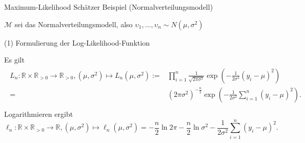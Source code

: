 \documentclass[
  8pt,
  ignorenonframetext,
]{beamer}
\newcommand{\ups} {\upsilon}
\begin{document}
\begin{frame}{Maximum-Likelihood Schätzer}
\protect\hypertarget{maximum-likelihood-schuxe4tzer-7}{}
Beispiel (Normalverteilungsmodell)

\small

\(\mathcal{M}\) sei das Normalverteilungsmodell, also
\(\ups_1,...,\ups_n \sim N\left(\mu,\sigma^2\right)\)

\noindent (1) Formulierung der Log-Likelihood-Funktion

\footnotesize

Es gilt \begin{align}
\begin{split}
L_n : \mathbb{R} \times \mathbb{R}_{>0} \to \mathbb{R}_{>0},
(\mu,\sigma^2) \mapsto L_n(\mu,\sigma^2)
:= & \prod_{i=1}^n \frac{1}{\sqrt{2\pi \sigma^2}}\exp\left(-\frac{1}{2\sigma^2}(y_i-\mu)^2\right) \\
 = & \left(2 \pi \sigma^2\right)^{-\frac{n}{2}}\exp\left(-\frac{1}{2\sigma^2}\sum_{i=1}^n(y_i-\mu)^2\right). \\
\end{split}
\end{align} Logarithmieren ergibt \begin{equation}
\ell_n : \mathbb{R} \times \mathbb{R}_{>0} \to \mathbb{R},
(\mu,\sigma^2) \mapsto \mathcal{\ell}_n(\mu,\sigma^2)
= -\frac{n}{2} \ln 2\pi - \frac{n}{2} \ln \sigma^2  -\frac{1}{2\sigma^2}\sum_{i=1}^n(y_i-\mu)^2.
\end{equation}
\end{frame}
\end{document}
